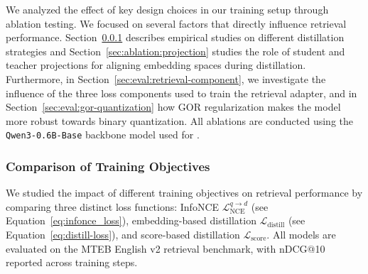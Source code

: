 \documentclass[11pt]{article}
\begin{document}
We analyzed the effect of key design choices in our training setup through ablation testing.
We focused on several factors that directly influence retrieval performance.
Section~\ref{sec:ablation:training-obj} describes empirical studies on different distillation strategies and Section~\ref{sec:ablation:projection} studies the role of student and teacher projections for aligning embedding spaces during distillation.
Furthermore, in Section~\ref{sec:eval:retrieval-component}, we investigate the influence of the three loss components used to train the retrieval adapter, and in Section~\ref{sec:eval:gor-quantization} how GOR regularization makes the model more robust towards binary quantization.
All ablations are conducted using the \texttt{Qwen3-0.6B-Base} backbone model used for \JEmbeddingVFiveTextSmall{}.

\subsubsection{Comparison of Training Objectives}
\label{sec:ablation:training-obj}

We studied the impact of different training objectives on retrieval performance by comparing three distinct loss functions: InfoNCE $\mathcal{L}_{\text{NCE}}^{q \rightarrow d}$ (see Equation~\eqref{eq:infonce_loss}), embedding-based distillation $\mathcal{L}_{\mathrm{distill}}$ (see Equation~\eqref{eq:distill-loss}), and score-based distillation $\mathcal{L}_{\mathrm{score}}$. All models are evaluated on the MTEB English v2 retrieval benchmark, with nDCG@10 reported across training steps.
\end{document}
